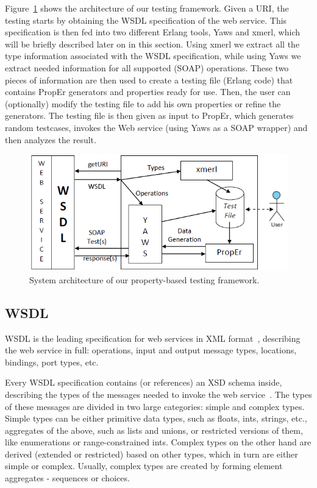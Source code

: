 \documentclass[submission,copyright]{eptcs}
\begin{document}
Figure~\ref{fig:architecture} shows the architecture of our testing
framework. Given a URI, the testing starts by obtaining the WSDL
specification of the web service. This specification is then fed into
two different Erlang tools, Yaws and xmerl, which will be briefly
described later on in this section. Using xmerl we extract all the
type information associated with the WSDL specification, while using
Yaws we extract needed information for all supported (SOAP)
operations. These two pieces of information are then used to create a
testing file (Erlang code) that contains PropEr generators and
properties ready for use. Then, the user can (optionally) modify the
testing file to add his own properties or refine the generators. The
testing file is then given as input to PropEr, which generates random
testcases, invokes the Web service (using Yaws as a SOAP wrapper) and
then analyzes the result.

\begin{figure}
\includegraphics{Framework.png}
\caption{System architecture of our property-based testing framework.}
\label{fig:architecture}
\end{figure}

\subsection{WSDL}

WSDL is the leading specification for web services in XML
format~\cite{wsdl_spec}, describing the web service in full:
operations, input and output message types, locations, bindings, port
types, etc.

Every WSDL specification contains (or references) an XSD schema
inside, describing the types of the messages needed to invoke the web
service~\cite{xsd_structure_spec,xsd_datatypes_spec}. The types of
these messages are divided in two large categories: simple and complex
types. Simple types can be either primitive data types, such as
floats, ints, strings, etc., aggregates of the above, such as lists
and unions, or restricted versions of them, like enumerations or
range-constrained ints. Complex types on the other hand are derived
(extended or restricted) based on other types, which in turn are
either simple or complex. Usually, complex types are created by
forming element aggregates - sequences or choices.
\end{document}
